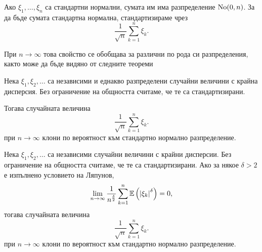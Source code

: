 \documentclass[numbers=endperiod, DIV=15, bibliography=totocnumbered]{scrartcl}
\begin{document}
Ако $\xi_1, \ldots, \xi_n$ са стандартни нормални, сумата им има разпределение $\operatorname{No}(0, n)$. За да бъде сумата стандартна нормална, стандартизираме чрез
\begin{displaymath}
  \frac 1 {\sqrt n} \sum_{k=1}^n \xi_k.
\end{displaymath}

При $n \to \infty$ това свойство се обобщава за различни по рода си разпределения, както може да бъде видяно от следните теореми

\begin{theorem}
  Нека $\xi_1, \xi_2, \ldots$ са независими и еднакво разпределени случайни величини с крайна дисперсия. Без ограничение на общността считаме, че те са стандартизирани.

  Тогава случайната величина
  \begin{displaymath}
    \frac 1 {\sqrt n} \sum_{k=1}^n \xi_k.
  \end{displaymath}
  при $n \to \infty$ клони по вероятност към стандартно нормално разпределение.
\end{theorem}

\begin{theorem}
  Нека $\xi_1, \xi_2, \ldots$ са независими случайни величини с крайни дисперсии. Без ограничение на общността считаме, че те са стандартизирани.
  Ако за някое $\delta > 2$ е изпълнено условието на Ляпунов,
  \begin{displaymath}
    \lim_{n \to \infty} \frac 1 {n^{\frac \delta 2}} \sum_{k=1}^n \mathbb{E} \left( {\left\vert \xi_k \right\vert}^\delta \right) = 0,
  \end{displaymath}
  тогава случайната величина
  \begin{displaymath}
    \frac 1 {\sqrt n} \sum_{k=1}^n \xi_k.
  \end{displaymath}
  при $n \to \infty$ клони по вероятност към стандартно нормално разпределение.
\end{theorem}

\printbibliography
\end{document}
